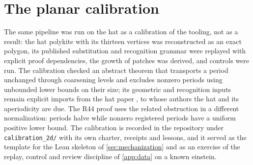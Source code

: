 \section{The planar calibration}\label{app:calibration}

The same pipeline was run on the hat as a calibration of the tooling, not as a result: the hat
polykite with its thirteen vertices was reconstructed as an exact polygon, its published
substitution and recognition grammar were replayed with explicit proof dependencies, the growth
of patches was derived, and controls were run. The calibration checked an abstract theorem that
transports a period unchanged through coarsening levels and excludes nonzero periods using
unbounded lower bounds on their size; its geometric and recognition inputs remain explicit
imports from the hat paper \cite{SMKGS24}, to whose authors the hat and its aperiodicity are due.
The R44 proof uses the related obstruction in a different normalization: periods halve while
nonzero registered periods have a uniform positive lower bound. The calibration is recorded in
the repository under \texttt{calibration\_2d/} with its own charter, receipts and lessons, and it
served as the template for the Lean skeleton of \cref{sec:mechanization} and as an exercise of the
replay, control and review discipline of \cref{app:data} on a known einstein.
